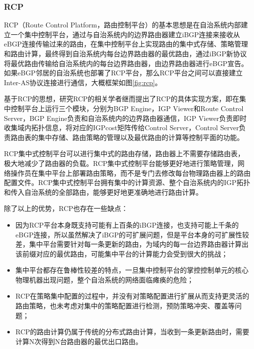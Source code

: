 \subsubsection{RCP\cite{Feamster2004The}}
RCP（Route Control Platform，路由控制平台）的基本思想是在自治系统内部建立一个集中控制平台，通过与自治系统内的边界路由器建立iBGP连接来接收从eBGP连接传输过来的路由，在集中控制平台上实现路由的集中式存储、策略管理和路由计算，最终得到自治系统内每台边界路由器的最优路由，通过iBGP新协议将最优路由传输给自治系统内的每台边界路由器，由边界路由器进行eBGP宣告。如果eBGP邻居的自治系统也部署了RCP平台，那么RCP平台之间可以直接建立Inter-AS协议连接进行通信，大概框架如图\ref{fig:rcp}。

基于RCP的思想，研究RCP的相关学者继而提出了RCP的具体实现方案\cite{Caldwell2005Design}，即在集中控制平台上运行三个模块，分别为BGP Engine，IGP Viewer和Route Control Server，BGP Engine负责和自治系统内的边界路由器通信，IGP Viewer负责即时收集域内拓扑信息，将对应的IGPcost矩阵传给Control Server，Control Server负责路由表的集中存储、路由策略的管理以及最优路由的计算等控制平面的功能。

RCP集中式控制平台可以进行集中式的路由存储，路由器上不需要存储路由表，极大地减少了路由器的负载。RCP集中式控制平台能够更好地进行策略管理，网络操作员在集中平台上部署路由策略，而不是专门去修改每台物理路由器上的路由配置文件\cite{journals/network/CaesarR05}。RCP集中式控制平台拥有集中的计算资源、整个自治系统内的IGP拓扑和传入自治系统的全部路由，能够更好地更准确地进行路由计算。

除了以上的优势，RCP也存在一些缺点\cite{Feamster2004The}：
\begin{itemize}
    \item 因为RCP平台本身既支持可能有上百条的iBGP连接，也支持可能上千条的eBGP连接，所以虽然解决了iBGP的可扩展问题，但是平台本身的可扩展性较差，集中平台需要针对每一条更新的路由，为域内的每一台边界路由器计算出该前缀对应的最优路由，可能集中平台的计算能力会受到很大的挑战；
    \item 集中平台都存在鲁棒性较差的特点，一旦集中控制平台的掌控控制单元的核心物理机器出现问题，整个自治系统的网络面临瘫痪的危险；
    \item RCP在策略集中配置的过程中，并没有对策略配置进行扩展从而支持更灵活的路由策略\cite{journals/jsac/WangAR09}，也未考虑对集中的策略配置进行检测，预防策略冲突、覆盖等问题；
    \item RCP的路由计算仍属于传统的分布式路由计算，当收到一条更新路由时，需要计算N次得到N台路由器的最优出口路由。
\end{itemize}

